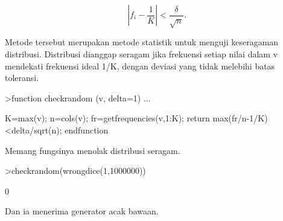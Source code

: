 \documentclass{article}
\begin{document}
\begin{eulernotebook}
\begin{eulercomment}
\begin{eulercomment}
\begin{eulercomment}
\end{eulercomment}
\begin{eulerformula}
\[
\left|f_i-\frac{1}{K}\right| < \frac{\delta}{\sqrt{n}}.
\]
\end{eulerformula}
\begin{eulercomment}
Metode tersebut merupakan metode statistik untuk menguji keseragaman
distribusi. Distribusi dianggap seragam jika frekuensi setiap nilai
dalam v mendekati frekuensi ideal 1/K, dengan deviasi yang tidak
melebihi batas toleransi.
\end{eulercomment}
\begin{eulerprompt}
>function checkrandom (v, delta=1) ...
\end{eulerprompt}
\begin{eulerudf}
    K=max(v); n=cols(v);
    fr=getfrequencies(v,1:K);
    return max(fr/n-1/K)<delta/sqrt(n);
    endfunction
\end{eulerudf}
\begin{eulercomment}
Memang fungsinya menolak distribusi seragam.
\end{eulercomment}
\begin{eulerprompt}
>checkrandom(wrongdice(1,1000000))
\end{eulerprompt}
\begin{euleroutput}
  0
\end{euleroutput}
\begin{eulercomment}
Dan ia menerima generator acak bawaan.


\end{eulercomment}
\end{eulercomment}
\end{eulercomment}
\end{eulernotebook}
\end{document}
